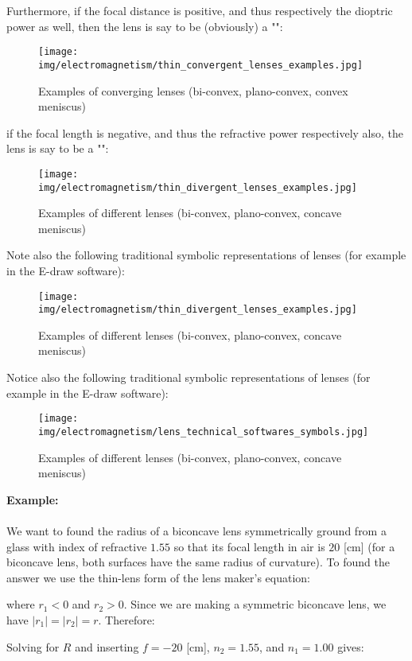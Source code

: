 	Furthermore, if the focal distance is positive, and thus respectively the dioptric power as well, then the lens is say to be (obviously) a "":
	\begin{figure}[H]
		\centering
		\texttt{[image: img/electromagnetism/thin\_convergent\_lenses\_examples.jpg]}
		\caption{Examples of converging lenses (bi-convex, plano-convex, convex meniscus)}
	\end{figure}
	if the focal length is negative, and thus the refractive power respectively also, the lens is say to be a "":
	\begin{figure}[H]
		\centering
		\texttt{[image: img/electromagnetism/thin\_divergent\_lenses\_examples.jpg]}
		\caption{Examples of different lenses (bi-convex, plano-convex, concave meniscus)}
	\end{figure}
	Note also the following traditional symbolic representations of lenses (for example in the E-draw software):
	\begin{figure}[H]
		\centering
		\texttt{[image: img/electromagnetism/thin\_divergent\_lenses\_examples.jpg]}
		\caption{Examples of different lenses (bi-convex, plano-convex, concave meniscus)}
	\end{figure}
	Notice also the following traditional symbolic representations of lenses (for example in the E-draw software):
	\begin{figure}[H]
		\centering
		\texttt{[image: img/electromagnetism/lens\_technical\_softwares\_symbols.jpg]}
		\caption[]{Examples of different lenses (bi-convex, plano-convex, concave meniscus)}
	\end{figure}
	
	\begin{tcolorbox}[colframe=black,colback=white,sharp corners]
	\textbf{{\Large {}}Example:}\\\\
	We want to found the radius of a biconcave lens symmetrically ground from a glass with index of refractive $1.55$ so that its focal length in air is $20$ [cm] (for a biconcave lens, both surfaces have the same radius of curvature). To found the answer we use the thin-lens form of the lens maker's equation:
	
	where $r_1<0$ and $r_2>0$. Since we are making a symmetric biconcave lens, we have $|r_1|=|r_2|=r$. Therefore:
	
	Solving for $R$ and inserting $f=-20$ [cm], $n_2=1.55$, and $n_1=1.00$ gives:
	
	\end{tcolorbox}
	
